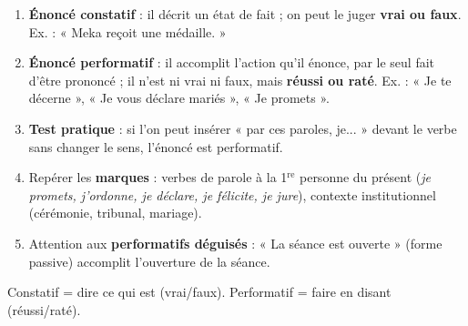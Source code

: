 \documentclass[11pt]{article}
\newcommand{\cle}[1]{{\popxbold\color{popdark}#1}}
\begin{document}
\begin{methode}
\begin{enumerate}
\item \textbf{Énoncé constatif} : il \cle{décrit} un état de fait ; on peut le juger \textbf{vrai ou faux}. Ex. : « Meka reçoit une médaille. »
\item \textbf{Énoncé performatif} : il \cle{accomplit} l'action qu'il énonce, par le seul fait d'être prononcé ; il n'est ni vrai ni faux, mais \textbf{réussi ou raté}. Ex. : « Je te décerne », « Je vous déclare mariés », « Je promets ».
\item \textbf{Test pratique} : si l'on peut insérer « par ces paroles, je... » devant le verbe sans changer le sens, l'énoncé est performatif.
\item Repérer les \textbf{marques} : verbes de parole à la 1$^{\text{re}}$ personne du présent (\emph{je promets, j'ordonne, je déclare, je félicite, je jure}), contexte institutionnel (cérémonie, tribunal, mariage).
\item Attention aux \textbf{performatifs déguisés} : « La séance est ouverte » (forme passive) accomplit l'ouverture de la séance.
\end{enumerate}
\begin{aretenir}
Constatif = dire ce qui est (vrai/faux). Performatif = faire en disant (réussi/raté).
\end{aretenir}
\end{methode}
\end{document}
